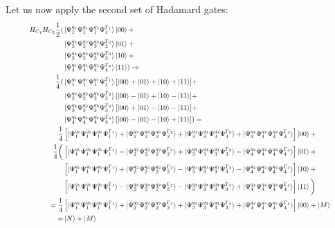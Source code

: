 Let us now apply the second set of Hadamard gates:
\begin{equation}
   \resizebox{.9\hsize}{!}{$\begin{split}
        H_{C_1}H_{C_2}\frac{1}{2}(
        &\ket{\Psi^{q_1}_1\Psi^{q_1}_1\Psi^{q_1}_1\Psi^{\Gamma_1}_1 }\ket{00}+\\
        &\ket{\Psi^{q_2}_2\Psi^{q_2}_2\Psi^{q_2}_2\Psi^{\Gamma_2}_2 }\ket{01}+\\
        &\ket{\Psi^{q_3}_3\Psi^{q_3}_3\Psi^{q_3}_3\Psi^{\Gamma_3}_3 }\ket{10}+\\
        &\ket{\Psi^{q_4}_4\Psi^{q_4}_4\Psi^{q_4}_4\Psi^{\Gamma_4}_4 }\ket{11}
        )\to\\
        \frac{1}{4}(
            &\ket{\Psi^{q_1}_1\Psi^{q_1}_1\Psi^{q_1}_1\Psi^{\Gamma_1}_1 }[\ket{00}+
            \ket{01}+
            \ket{10}+
            \ket{11}]+\\
            &\ket{\Psi^{q_2}_2\Psi^{q_2}_2\Psi^{q_2}_2\Psi^{\Gamma_2}_2 }[\ket{00}-
            \ket{01}+
            \ket{10}-
            \ket{11}]+\\
            &\ket{\Psi^{q_3}_3\Psi^{q_3}_3\Psi^{q_3}_3\Psi^{\Gamma_3}_3 }[\ket{00}+
            \ket{01}-
            \ket{10}-
            \ket{11}]+\\
            &\ket{\Psi^{q_4}_4\Psi^{q_4}_4\Psi^{q_4}_4\Psi^{\Gamma_4}_4 }[\ket{00}-
            \ket{01}-
            \ket{10}+
            \ket{11}]
    ) =\\ 
        \frac{1}{4}&\left[\ket{\Psi^{q_1}_1\Psi^{q_1}_1\Psi^{q_1}_1\Psi^{\Gamma_1}_1 }+\ket{\Psi^{q_2}_2\Psi^{q_2}_2\Psi^{q_2}_2\Psi^{\Gamma_2}_2 }+\ket{\Psi^{q_3}_3\Psi^{q_3}_3\Psi^{q_3}_3\Psi^{\Gamma_3}_3 }+\ket{\Psi^{q_4}_4\Psi^{q_4}_4\Psi^{q_4}_4\Psi^{\Gamma_4}_4 }\right]\ket{00}+\\
    \frac{1}{4}\bigg(&\left[\ket{\Psi^{q_1}_1\Psi^{q_1}_1\Psi^{q_1}_1\Psi^{\Gamma_1}_1 }-\ket{\Psi^{q_2}_2\Psi^{q_2}_2\Psi^{q_2}_2\Psi^{\Gamma_2}_2 }+\ket{\Psi^{q_3}_3\Psi^{q_3}_3\Psi^{q_3}_3\Psi^{\Gamma_3}_3 }-\ket{\Psi^{q_4}_4\Psi^{q_4}_4\Psi^{q_4}_4\Psi^{\Gamma_4}_4 }\right]\ket{01}+\\
        &\left[\ket{\Psi^{q_1}_1\Psi^{q_1}_1\Psi^{q_1}_1\Psi^{\Gamma_1}_1 }+\ket{\Psi^{q_2}_2\Psi^{q_2}_2\Psi^{q_2}_2\Psi^{\Gamma_2}_2 }-\ket{\Psi^{q_3}_3\Psi^{q_3}_3\Psi^{q_3}_3\Psi^{\Gamma_3}_3 }-\ket{\Psi^{q_4}_4\Psi^{q_4}_4\Psi^{q_4}_4\Psi^{\Gamma_4}_4 }\right]\ket{10}+\\
        &\left[\ket{\Psi^{q_1}_1\Psi^{q_1}_1\Psi^{q_1}_1\Psi^{\Gamma_1}_1 }-\ket{\Psi^{q_2}_2\Psi^{q_2}_2\Psi^{q_2}_2\Psi^{\Gamma_2}_2 }-\ket{\Psi^{q_3}_3\Psi^{q_3}_3\Psi^{q_3}_3\Psi^{\Gamma_3}_3 }+\ket{\Psi^{q_4}_4\Psi^{q_4}_4\Psi^{q_4}_4\Psi^{\Gamma_4}_4 }\right]\ket{11}
    \bigg) \\= 
        \frac{1}{4}&\left[\ket{\Psi^{q_1}_1\Psi^{q_1}_1\Psi^{q_1}_1\Psi^{\Gamma_1}_1 }+\ket{\Psi^{q_2}_2\Psi^{q_2}_2\Psi^{q_2}_2\Psi^{\Gamma_2}_2 }+\ket{\Psi^{q_3}_3\Psi^{q_3}_3\Psi^{q_3}_3\Psi^{\Gamma_3}_3 }+\ket{\Psi^{q_4}_4\Psi^{q_4}_4\Psi^{q_4}_4\Psi^{\Gamma_4}_4 }\right]\ket{00}+\ket{M}\\=&\ket{N}+\ket{M}
   \end{split}$}
\end{equation}
